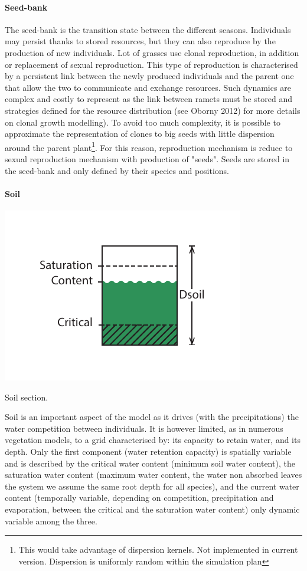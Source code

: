 \documentclass[a4paper,twoside, justified,marginals=raggedright, nobib]{tufte-handout}
\begin{document}
\paragraph{Seed-bank} The seed-bank is the transition state between the different seasons. Individuals may persist thanks to stored resources, but they can also reproduce by the production of new individuals. Lot of grasses use clonal reproduction, in addition or replacement of sexual reproduction. This type of reproduction is characterised by a persistent link between the newly produced individuals and the parent one that allow the two to communicate and exchange resources. Such dynamics are complex and costly to represent as the link between ramets must be stored and strategies defined for the resource distribution (see Oborny 2012) for more details on clonal growth modelling). To avoid too much complexity, it is possible to approximate the representation of clones to big seeds with little dispersion around the parent plant\footnote{This would take advantage of dispersion kernels. Not implemented in current version. Dispersion is uniformly random within the simulation plan}. For this reason, reproduction mechanism is reduce to sexual reproduction mechanism with production of "seeds". Seeds are stored in the seed-bank and only defined by their species and positions. 

\paragraph{Soil}
\begin{marginfigure}
\includegraphics{./Figures/soil_section_m.pdf}
\caption{Soil section.}
\end{marginfigure}
Soil is an important aspect of the model as it drives (with the precipitations) the water competition between individuals. It is however limited, as in numerous vegetation models, to a grid characterised by: its capacity to retain water, and its depth. Only the first component (water retention capacity) is spatially variable and is described by the critical water content (minimum soil water content), the saturation water content (maximum water content, the water non absorbed leaves the system we assume the same root depth for all species), and the current water content (temporally variable, depending on competition, precipitation and evaporation, between the critical and the saturation water content) only dynamic variable among the three.
\end{document}
